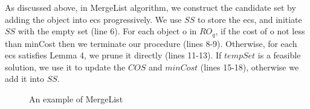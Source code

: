 As discussed above, in MergeList algorithm, we construct the candidate set by adding the object into ecs progressively. We use $SS$ to store the ecs, and initiate $SS$ with the empty set (line 6). For each object o in $RO_q$, if the cost of o not less than minCost then we terminate our procedure (lines 8-9). Otherwise, for each ecs satisfies Lemma 4, we prune it directly (lines 11-13). If $tempSet$ is a feasible solution, we use it to update the $COS$ and $minCost$ (lines 15-18), otherwise we add it into $SS$.

\begin{figure}[!ht] \centering
\caption{An example of MergeList}
\label{F30}
\end{figure}

